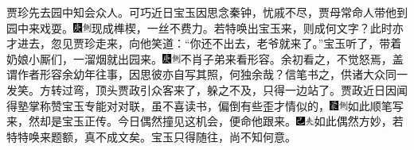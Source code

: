 贾珍先去园中知会众人。可巧近日宝玉因思念秦钟，忧戚不尽，贾母常命人带他到园中来戏耍。{\includegraphics[width=3mm]{../Images/00004}\includegraphics[width=3mm]{../Images/00011}\footnotesize \kaishu 现成榫楔，一丝不费力。若特唤出宝玉来，则成何文字？}此时亦才进去，忽见贾珍走来，向他笑道：``你还不出去，老爷就来了。''宝玉听了，带着奶娘小厮们，一溜烟就出园来。{\includegraphics[width=3mm]{../Images/00004}\includegraphics[width=3mm]{../Images/00011}\footnotesize \kaishu 不肖子弟来看形容。余初看之，不觉怒焉，盖谓作者形容余幼年往事，因思彼亦自写其照，何独余哉？信笔书之，供诸大众同一发笑。}方转过弯，顶头贾政引众客来了，躲之不及，只得一边站了。贾政近日因闻得塾掌称赞宝玉专能对对联，虽不喜读书，偏倒有些歪才情似的，{\includegraphics[width=3mm]{../Images/00006}\includegraphics[width=3mm]{../Images/00011}\footnotesize \kaishu 如此顺笔写来，然却是宝玉正传。}今日偶然撞见这机会，便命他跟来。{\includegraphics[width=3mm]{../Images/00003}\includegraphics[width=3mm]{../Images/00012}\footnotesize \kaishu 如此偶然方妙，若特特唤来题额，真不成文矣。}宝玉只得随往，尚不知何意。

